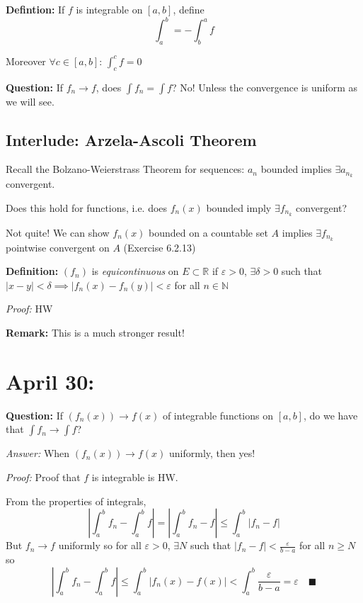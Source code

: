\documentclass[12pt]{report}
\newcommand{\R}{\mathbb{R}}
\newcommand{\N}{\mathbb{N}}
\newcommand{\qed}{\quad \blacksquare}
\newcommand{\abs}[1]{\left\vert #1 \right\vert}
\newcommand{\ep}{\varepsilon}
\newenvironment*{tbox}[2][gray]{
    \begin{tcolorbox}[
        parbox=false,
        colback=#1!5!white,
        colframe=#1!75!black,
        breakable,
        title={#2}
    ]}
    {\end{tcolorbox}}
\begin{document}
        \textbf{Defintion:} If $f$ is integrable on $[a, b]$, define 
        \[\int_a^b = -\int_b^a f\]

        Moreover $\forall c \in [a, b]$: $\int_c^c f = 0$ 

        \textbf{Question:} If $f_n \to f$, does $\int f_n = \int f$? No! Unless the convergence is uniform as we will see. 

        \subsection*{Interlude: Arzela-Ascoli Theorem}
            Recall the Bolzano-Weierstrass Theorem for sequences: $a_n$ bounded implies $\exists a_{n_k}$ convergent. 

            Does this hold for functions, i.e. does $f_n(x)$ bounded imply $\exists f_{n_k}$ convergent? 

            Not quite! We can show $f_n(x)$ bounded on a countable set $A$ implies $\exists f_{n_k}$ pointwise convergent on $A$ (Exercise 6.2.13)

            \textbf{Definition:} $(f_n)$ is \emph{equicontinuous} on $E \subset \R$ if $\ep > 0$, $\exists \delta > 0$ such that $\abs{x - y} < \delta \implies \abs{f_n(x) - f_n(y)} < \ep$ for all $n \in \N$

            \begin{tbox}{\textbf{Theorem:} If $f_n(x)$ is bounded and equicontinuous then $\exists f_{n_k}$ uniformly convergent on $A$.}
                \emph{Proof:} HW
            \end{tbox}

            \textbf{Remark:} This is a much stronger result!  

\section{April 30:} 
    \textbf{Question:} If $(f_n(x)) \to f(x)$ of integrable functions on $[a, b]$, do we have that $\int f_n \to \int f$? 

    \emph{Answer:} When $(f_n(x)) \to f(x)$ uniformly, then yes! 

    \begin{tbox}{\textbf{Integrable Limit Theorem:} Assume that $f_n \to f$ uniformly on $[a, b]$ and that each $f_n$ is integrable on $[a, b]$. Then $f$ is integrable and \[\lim_{n \to \infty} \int_a^b f_n = \int_a^b f\]}
        \emph{Proof:} Proof that $f$ is integrable is HW. 

        From the properties of integrals,
        \[\abs{\int_a^b f_n - \int_a^b f} = \abs{\int_a^b f_n - f} \leq \int_a^b \abs{f_n - f}\]
        But $f_n \to f$ uniformly so for all $\ep > 0$, $\exists N$ such that $\abs{f_n - f} < \frac{\ep}{b - a}$ for all $n \geq N$ so 
        \[\abs{\int_a^b f_n - \int_a^b f} \leq \int_a^b \abs{f_n(x) - f(x)} < \int_a^b \frac{\ep}{b - a} = \ep \qed\]
    \end{tbox}
\end{document}
